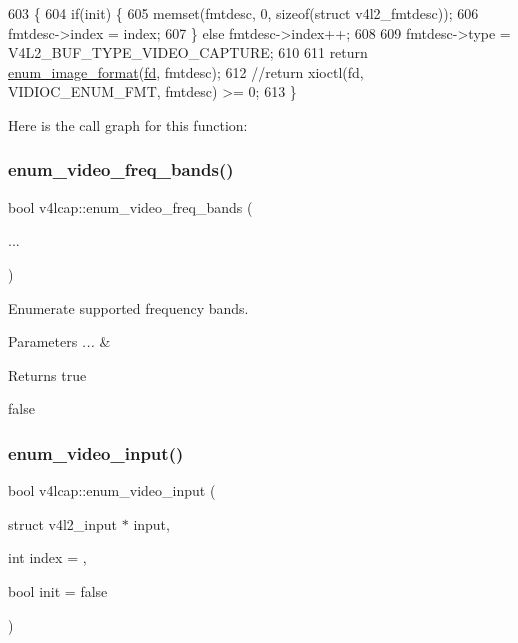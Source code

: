 \begin{DoxyCode}
603                                                                                   \{
604     \textcolor{keywordflow}{if}(init) \{
605         memset(fmtdesc, 0, \textcolor{keyword}{sizeof}(\textcolor{keyword}{struct} v4l2\_fmtdesc));
606         fmtdesc->index = index;
607     \} \textcolor{keywordflow}{else} fmtdesc->index++;
608 
609     fmtdesc->type = V4L2\_BUF\_TYPE\_VIDEO\_CAPTURE;
610 
611     \textcolor{keywordflow}{return} \hyperlink{classv4lcap_a4f5a8ccdd2a75e9d2f2d4d541fdb84dd}{enum\_image\_format}(\hyperlink{classv4lcap_a38109593bde997dad13b3a461569573d}{fd}, fmtdesc);
612     \textcolor{comment}{//return xioctl(fd, VIDIOC\_ENUM\_FMT, fmtdesc) >= 0;}
613 \}
\end{DoxyCode}
Here is the call graph for this function\+:
\mbox{\label{classv4lcap_a16a988e0ba3bce064c88d17d54551821}} 
\subsubsection{\texorpdfstring{enum\+\_\+video\+\_\+freq\+\_\+bands()}{enum\_video\_freq\_bands()}}
{\footnotesize\ttfamily bool v4lcap\+::enum\+\_\+video\+\_\+freq\+\_\+bands (\begin{DoxyParamCaption}\item[{}]{... }\end{DoxyParamCaption})}



Enumerate supported frequency bands. 


\begin{DoxyParams}{Parameters}
{\em ...} & \\
\hline
\end{DoxyParams}
\begin{DoxyReturn}{Returns}
true 

false 
\end{DoxyReturn}
\mbox{\label{classv4lcap_a77a9eda7d80dcf417afd97e6417d900b}} 
\subsubsection{\texorpdfstring{enum\+\_\+video\+\_\+input()}{enum\_video\_input()}}
{\footnotesize\ttfamily bool v4lcap\+::enum\+\_\+video\+\_\+input (\begin{DoxyParamCaption}\item[{struct v4l2\+\_\+input $\ast$}]{input,  }\item[{int}]{index = {},  }\item[{bool}]{init = {\ttfamily false} }\end{DoxyParamCaption})}



